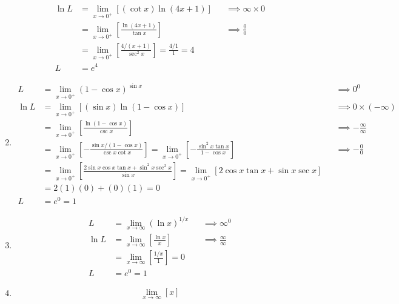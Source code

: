 \documentclass[12pt, A4]{report}
\begin{document}
\begin{enumerate}
\begin{align*}
						\ln L &= \lim_{x\to 0^+}[(\cot x)\ln(4x + 1)]
								&&\implies \infty \times 0 \\
							&= \lim_{x\to 0^+}\left[\frac{\ln(4x + 1)}{\tan x}\right]
								&&\implies \frac{0}{0} \\
							&= \lim_{x\to 0^+}\left[\frac{4/(x + 1)}{\sec^2 x}\right] 
								= \frac{4/1}{1} 
								= 4 \\
						L &= e^4
					\end{align*}
				\item
					\begin{align*}
						L &= \lim_{x\to 0^+}(1 - \cos x)^{\sin x}
								&&\implies 0^0 \\
						\ln L &= \lim_{x\to 0^+}\left[(\sin x)\ln(1 - \cos x)\right]
								&&\implies 0 \times (-\infty) \\
							&= \lim_{x\to 0^+}\left[\frac{\ln(1 - \cos x)}{\csc x}\right]
								&&\implies -\frac{\infty}{\infty} \\
							&= \lim_{x\to 0^+}\left[-\frac{\sin x /(1 - \cos x)}{\csc x \cot x}\right]
								= \lim_{x\to 0^+}\left[-\frac{\sin^2x\tan x}{1 - \cos x}\right]
								&&\implies -\frac{0}{0} \\
							&= \lim_{x\to 0^+}\left[\frac{2\sin x \cos x \tan x + \sin^2 x \sec^2 x}{\sin x}\right]
								= \lim_{x\to 0^+}[2\cos x \tan x + \sin x \sec x] \\
							&= 2(1)(0) + (0)(1) = 0 \\
						L &= e^0 = 1
					\end{align*}
				\item
					\begin{align*}
						L &= \lim_{x\to\infty} (\ln x)^{1/x}
								&&\implies \infty^0 \\
						\ln L &= \lim_{x\to\infty}\left[\frac{\ln x}{x}\right]
								&&\implies \frac{\infty}{\infty} \\
							&= \lim_{x\to\infty}\left[\frac{1/x}{1}\right] = 0 \\
						L &= e^0 = 1
					\end{align*}
				\item
					\begin{align*}
						\lim_{x\to\infty}\left[x\right]
					\end{align*}
			\end{enumerate}
\end{document}
